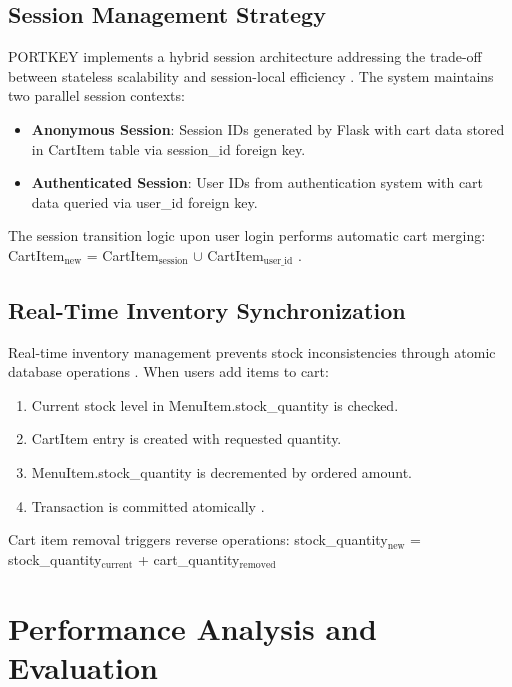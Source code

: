 \documentclass[conference]{IEEEtran}
\begin{document}
\subsection{Session Management Strategy}

PORTKEY implements a hybrid session architecture addressing the trade-off between stateless scalability and session-local efficiency \cite{b4, b62, b65}. The system maintains two parallel session contexts:

\begin{itemize}
    \item \textbf{Anonymous Session}: Session IDs generated by Flask with cart data stored in CartItem table via session\_id foreign key.
    \item \textbf{Authenticated Session}: User IDs from authentication system with cart data queried via user\_id foreign key.
\end{itemize}

The session transition logic upon user login performs automatic cart merging: CartItem$_{\text{new}}$ = CartItem$_{\text{session}}$ $\cup$ CartItem$_{\text{user\_id}}$ \cite{b68}.

\subsection{Real-Time Inventory Synchronization}

Real-time inventory management prevents stock inconsistencies through atomic database operations \cite{b63, b66}. When users add items to cart:

\begin{enumerate}
    \item Current stock level in MenuItem.stock\_quantity is checked.
    \item CartItem entry is created with requested quantity.
    \item MenuItem.stock\_quantity is decremented by ordered amount.
    \item Transaction is committed atomically \cite{b91, b94}.
\end{enumerate}

Cart item removal triggers reverse operations: stock\_quantity$_{\text{new}}$ = stock\_quantity$_{\text{current}}$ + cart\_quantity$_{\text{removed}}$

\section{Performance Analysis and Evaluation}
\end{document}
